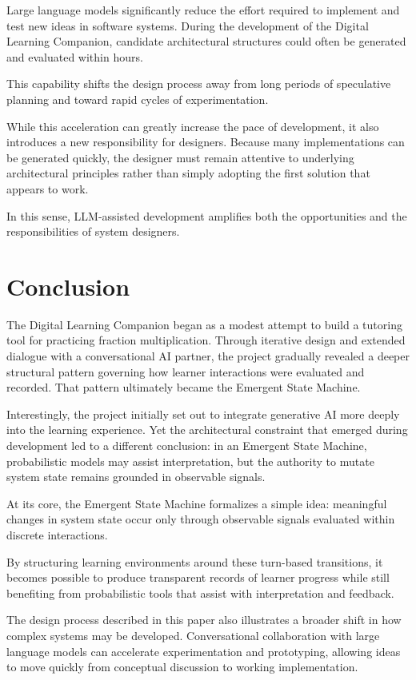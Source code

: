 \documentclass[11pt]{article}
\begin{document}
Large language models significantly reduce the effort required to implement and test new ideas in software systems. During the development of the Digital Learning Companion, candidate architectural structures could often be generated and evaluated within hours.

This capability shifts the design process away from long periods of speculative planning and toward rapid cycles of experimentation.

While this acceleration can greatly increase the pace of development, it also introduces a new responsibility for designers. Because many implementations can be generated quickly, the designer must remain attentive to underlying architectural principles rather than simply adopting the first solution that appears to work.

In this sense, LLM-assisted development amplifies both the opportunities and the responsibilities of system designers.


\section{Conclusion}

The Digital Learning Companion began as a modest attempt to build a tutoring tool for practicing fraction multiplication. Through iterative design and extended dialogue with a conversational AI partner, the project gradually revealed a deeper structural pattern governing how learner interactions were evaluated and recorded. That pattern ultimately became the Emergent State Machine.

Interestingly, the project initially set out to integrate generative AI more deeply into the learning experience. Yet the architectural constraint that emerged during development led to a different conclusion: in an Emergent State Machine, probabilistic models may assist interpretation, but the authority to mutate system state remains grounded in observable signals.

At its core, the Emergent State Machine formalizes a simple idea: meaningful changes in system state occur only through observable signals evaluated within discrete interactions.

By structuring learning environments around these turn-based transitions, it becomes possible to produce transparent records of learner progress while still benefiting from probabilistic tools that assist with interpretation and feedback.

The design process described in this paper also illustrates a broader shift in how complex systems may be developed. Conversational collaboration with large language models can accelerate experimentation and prototyping, allowing ideas to move quickly from conceptual discussion to working implementation.
\end{document}
